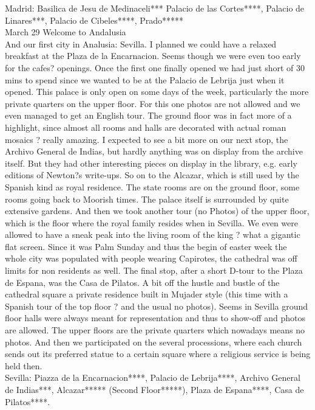 Madrid:
Basilica de Jesu de Medinaceli***
Palacio de las Cortes****,
Palacio de Linares***,
Palacio de Cibeles****,
Prado*****\\

March 29 Welcome to Andalusia\\
And our first city in Analusia: Sevilla. I planned we could have a relaxed breakfast at the  Plaza de la Encarnacion. Seems though we were even too early for the cafes? openings. Once the first one finally opened we had just short of 30 mins to spend since we wanted to be at the Palacio de Lebrija just when it opened. This palace is only open on some days of the week, particularly the more private quarters on the upper floor. For this one photos are not allowed and we even managed to get an English tour. The ground floor was in fact more of a highlight, since almost all rooms and halls are decorated with actual roman mosaics ? really amazing. I expected to see a bit more on our next stop, the Archivo General de Indias, but hardly anything was on display from the archive itself. But they had other interesting pieces on display in the library, e.g. early editions of Newton?s write-ups. So on to the Alcazar, which is still used by the Spanish kind as royal residence. The state rooms are on the ground floor, some rooms going back to Moorish times. The palace itself is surrounded by quite extensive gardens. And then we took another tour (no Photos) of the upper floor, which is the floor where the royal family resides when in Sevilla. We even were allowed to have a sneak peak into the living room of the king ? what a gigantic flat screen. Since it was Palm Sunday and thus the begin of easter week the whole city was populated with people wearing Capirotes, the cathedral was off limits for non residents as well. The final stop, after a short D-tour to the Plaza de Espana, was the Casa de Pilatos. A bit off the hustle and bustle of the cathedral square a private residence built in Mujader style (this time with a Spanish tour of the top floor ? and the usual no photos). Seems in Sevilla ground floor halls were always meant for representation and thus to show-off and photos are allowed. The upper floors are the private quarters which nowadays means no photos. And then we participated on the several processions, where each church sends out its preferred statue to a certain square where a religious service is being held then.\\

Sevilla:
Piazza de la Encarnacion****,
Palacio de Lebrija****,
Archivo General de Indias***,
Alcazar***** (Second Floor*****),
Plaza de Espana****,
Casa de Pilatos****.\\

